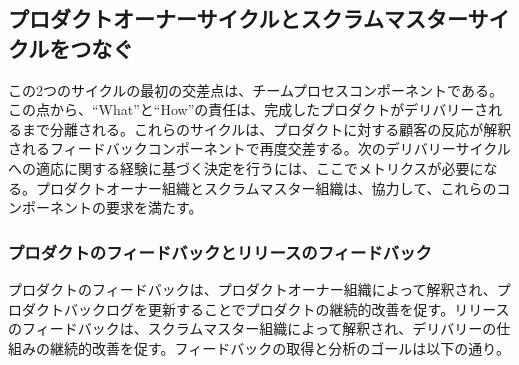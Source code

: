 \documentclass[12pt,a4paper,parskip=full]{scrartcl}
\begin{document}

\subsection{プロダクトオーナーサイクルとスクラムマスターサイクルをつなぐ}\label{Connecting-the-product-owner-and-scrum-master-cycles}

この2つのサイクルの最初の交差点は、チームプロセスコンポーネントである。この点から、“What”と“How”の責任は、完成したプロダクトがデリバリーされるまで分離される。これらのサイクルは、プロダクトに対する顧客の反応が解釈されるフィードバックコンポーネントで再度交差する。次のデリバリーサイクルへの適応に関する経験に基づく決定を行うには、ここでメトリクスが必要になる。プロダクトオーナー組織とスクラムマスター組織は、協力して、これらのコンポーネントの要求を満たす。

\subsubsection{プロダクトのフィードバックとリリースのフィードバック}\label{product-feedback-and-release-feedback}

プロダクトのフィードバックは、プロダクトオーナー組織によって解釈され、プロダクトバックログを更新することでプロダクトの継続的改善を促す。リリースのフィードバックは、スクラムマスター組織によって解釈され、デリバリーの仕組みの継続的改善を促す。フィードバックの取得と分析のゴールは以下の通り。
\end{document}
